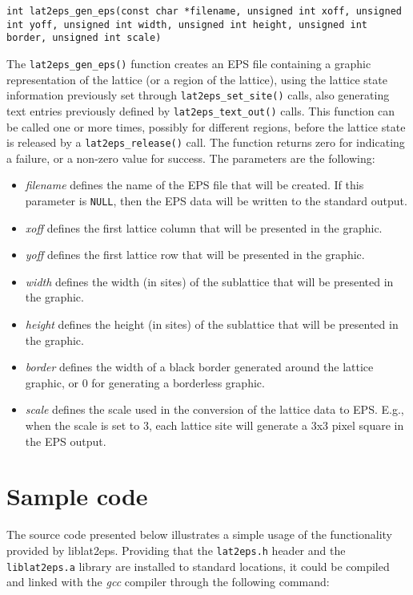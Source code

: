 \documentclass[a4paper]{article}
\begin{document}
\texttt{int lat2eps\_gen\_eps(const char *filename, unsigned int xoff, unsigned int yoff, unsigned int width, unsigned int height, unsigned int border, unsigned int scale)}
\bigbreak

The \texttt{lat2eps\_gen\_eps()} function creates an EPS file containing a graphic representation of the lattice (or a region of the lattice), using the lattice state information previously set through \texttt{lat2eps\_set\_site()} calls, also generating text entries previously defined by \texttt{lat2eps\_text\_out()} calls. This function can be called one or more times, possibly for different regions, before the lattice state is released by a \texttt{lat2eps\_release()} call. The function returns zero for indicating a failure, or a non-zero value for success. The parameters are the following:

\begin{itemize}
  \item \textit{filename} defines the name of the EPS file that will be created. If this parameter is \texttt{NULL}, then the EPS data will be written to the standard output.
  \item \textit{xoff} defines the first lattice column that will be presented in the graphic.
  \item \textit{yoff} defines the first lattice row that will be presented in the graphic.
  \item \textit{width} defines the width (in sites) of the sublattice that will be presented in the graphic.
  \item \textit{height} defines the height (in sites) of the sublattice that will be presented in the graphic.
  \item \textit{border} defines the width of a black border generated around the lattice graphic, or 0 for generating a borderless graphic.
  \item \textit{scale} defines the scale used in the conversion of the lattice data to EPS. E.g., when the scale is set to 3, each lattice site will generate a 3x3 pixel square in the EPS output.
\end{itemize} 
\bigbreak\bigbreak
\newpage

\section{Sample code}

The source code presented below illustrates a simple usage of the functionality provided by liblat2eps. Providing that the \texttt{lat2eps.h} header and the \texttt{liblat2eps.a} library are installed to standard locations, it could be compiled and linked with the \textit{gcc} compiler through the following command:
\bigbreak
\end{document}
